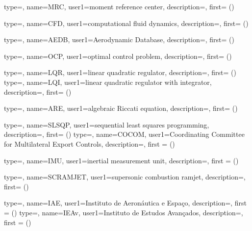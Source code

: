 {type=\acronymtype,
    name={MRC},
    user1={moment reference center},
    description={},
    first={ ()}
}

{type=\acronymtype,
    name={CFD},
    user1={computational fluid dynamics},
    description={},
    first={ ()}
}

{type=\acronymtype,
    name={AEDB},
    user1={Aerodynamic Database},
    description={},
    first={ ()}
}

{type=\acronymtype,
    name={OCP},
    user1={optimal control problem},
    description={},
    first={ ()}
}

{type=\acronymtype,
    name={LQR},
    user1={linear quadratic regulator},
    description={},
    first={ ()}
}
{type=\acronymtype,
    name={LQI},
    user1={linear quadratic regulator with integrator},
    description={},
    first={ ()}
}

{type=\acronymtype,
    name={ARE},
    user1={algebraic Riccati equation},
    description={},
    first={ ()}
}

{type=\acronymtype,
    name={SLSQP},
    user1={sequential least squares programming},
    description={},
    first={ ()}
}
{type=\acronymtype,
    name={COCOM},
    user1={Coordinating Committee for Multilateral Export Controls},
    description={},
    first = { ()}
}


{type=\acronymtype,
    name={IMU},
    user1={inertial measurement unit},
    description={},
    first = { ()}
}

{    type=\acronymtype,
    name={SCRAMJET},
    user1={supersonic combustion ramjet},
    description={},
    first={ ()}
}


{type=\acronymtype,
    name={IAE},
    user1={Instituto de Aeronáutica e Espaço},
    description={},
    first = { ()}
}
{type=\acronymtype,
    name={IEAv},
    user1={Instituto de Estudos Avan\c{c}ados},
    description={},
    first = { ()}
}
